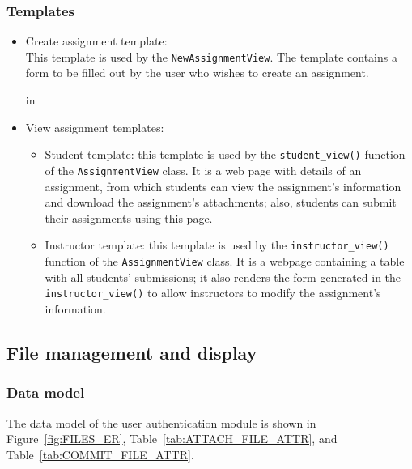 \subsubsection{Templates}
\begin{itemize}
    \item Create assignment template: \\
    This template is used by the \texttt{NewAssignmentView}.
    The template
    contains a form to be filled out by the user who wishes to create an
    assignment.

     in

    \item View assignment templates:
    \begin{itemize}
        \item Student template: 
            this template is used by the \texttt{student\_view()} function
            of the \texttt{AssignmentView} class. It is
            a web page with details of an assignment, from
            which students can view the assignment's information and
            download the assignment's attachments; also, students can submit
            their assignments using this page.
        \item Instructor template:
            this template is used by the \texttt{instructor\_view()} function
            of the \texttt{AssignmentView} class. It is a webpage
            containing a table with all students' submissions; it also renders
            the form generated in the \texttt{instructor\_\-view()} to allow
            instructors to modify the assignment's information.
    \end{itemize}
\end{itemize}

\FloatBarrier




\subsection{File management and display}

\subsubsection{Data model}
The data model of the user authentication module is shown in
Figure~\ref{fig:FILES_ER}, Table~\ref{tab:ATTACH_FILE_ATTR},
and Table~\ref{tab:COMMIT_FILE_ATTR}. \medskip


